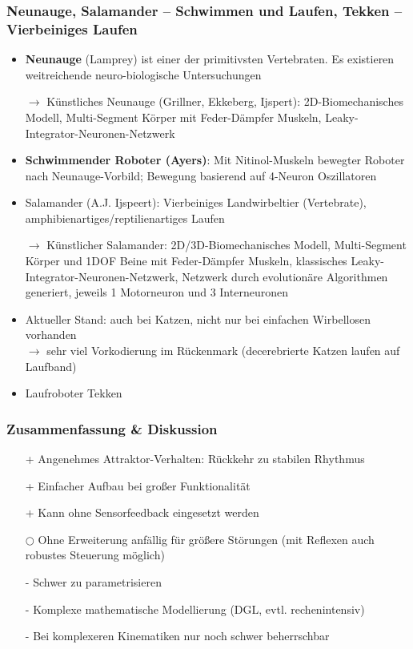 \subsubsection{Neunauge, Salamander – Schwimmen und Laufen, Tekken – Vierbeiniges Laufen}
\begin{itemize}
\item \textbf{Neunauge} (Lamprey) ist einer der primitivsten Vertebraten. Es existieren weitreichende neuro-biologische Untersuchungen
\item[$\rightarrow$] Künstliches Neunauge (Grillner, Ekkeberg, Ijspert): 2D-Biomechanisches Modell, Multi-Segment Körper mit Feder-Dämpfer Muskeln, Leaky-Integrator-Neuronen-Netzwerk
\item \textbf{Schwimmender Roboter (Ayers)}: Mit Nitinol-Muskeln bewegter Roboter nach Neunauge-Vorbild; Bewegung basierend auf 4-Neuron Oszillatoren
\item Salamander (A.J. Ijspeert): Vierbeiniges Landwirbeltier (Vertebrate), amphibienartiges/reptilienartiges Laufen
\item[$\rightarrow$] Künstlicher Salamander: 2D/3D-Biomechanisches Modell, Multi-Segment Körper und 1DOF Beine mit Feder-Dämpfer Muskeln, \glqq klassisches\grqq{} Leaky-Integrator-Neuronen-Netzwerk, Netzwerk durch evolutionäre Algorithmen generiert, jeweils 1 Motorneuron und 3 Interneuronen
\item Aktueller Stand: auch bei Katzen, nicht nur bei einfachen Wirbellosen vorhanden\\
$\rightarrow$ sehr viel Vorkodierung im Rückenmark (decerebrierte Katzen laufen auf Laufband)
\item Laufroboter Tekken 
\end{itemize}
\subsubsection{Zusammenfassung \& Diskussion}
\begin{itemize}
\item[+] Angenehmes Attraktor-Verhalten: Rückkehr zu stabilen Rhythmus
\item[+] Einfacher Aufbau bei großer Funktionalität
\item[+] Kann ohne Sensorfeedback eingesetzt werden
\item[$\bigcirc$] Ohne Erweiterung anfällig für größere Störungen (mit Reflexen auch robustes Steuerung möglich)
\item[-] Schwer zu parametrisieren
\item[-] Komplexe mathematische Modellierung (DGL, evtl. rechenintensiv)
\item[-] Bei komplexeren Kinematiken nur noch schwer beherrschbar
\end{itemize}
